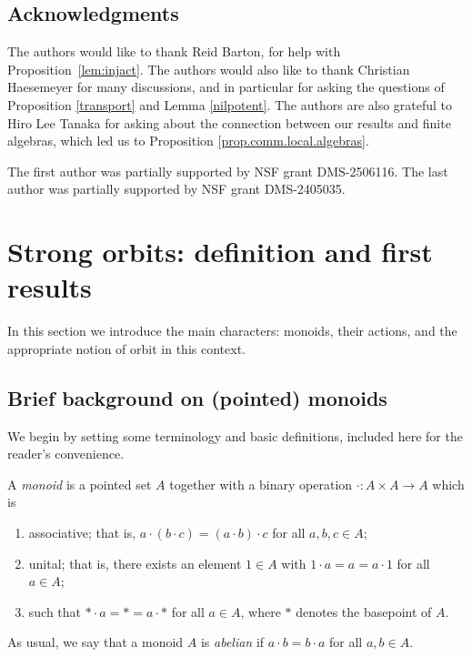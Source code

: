 \documentclass[11pt]{amsart}
\begin{document}
\subsection*{Acknowledgments} The authors would like to thank Reid Barton, for help with Proposition~\ref{lem:injact}. The authors would also like to thank Christian Haesemeyer for many discussions, and in particular for asking the questions of Proposition \ref{transport} and Lemma \ref{nilpotent}. The authors are also grateful to Hiro Lee Tanaka for asking about the connection between our results and finite algebras, which led us to  Proposition \ref{prop.comm.local.algebras}.

The first author was partially supported by NSF grant DMS-2506116.  The last author was partially supported by NSF grant DMS-2405035.

\section{Strong orbits: definition and first results}

In this section we introduce the main characters: monoids, their actions, and the appropriate notion of orbit in this context. 

\subsection{Brief background on (pointed) monoids}\label{subsec.background}

We begin by setting some terminology and basic definitions, included here for the reader's convenience.

\begin{definition}\label{defn:ptdmonoid}
    A \emph{monoid} is a pointed set $A$ together with a binary operation $\cdot\colon A\times A\to A$ which is
    \begin{enumerate}
        \item associative; that is, $a\cdot (b\cdot c)=(a\cdot b)\cdot c$ for all $a,b,c\in A$;
        \item unital; that is, there exists an element $1\in A$ with $1\cdot a=a=a\cdot 1$ for all $a\in A$;
        \item such that $*\cdot a=*=a\cdot *$ for all $a\in A$, where $*$ denotes the basepoint of $A$.
    \end{enumerate}
    As usual, we say that a monoid $A$ is \emph{abelian} if $a\cdot b=b\cdot a$ for all $a,b\in A$.
\end{definition}
\end{document}
